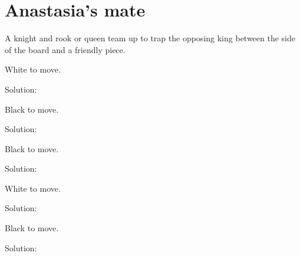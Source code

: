 \documentclass{book}
\begin{document}
\section{Anastasia's mate}
A knight and rook or queen team up to trap the opposing king between the side of the board and a friendly piece.\begin{multicols}{2} 
\begin{samepage} 
\newgame 


 
\showboard
 
 White to move. 
 
Solution: 
 
\end{samepage}\begin{samepage} 
\newgame 


 
\showboard
 
 Black to move. 
 
Solution: 
 
\end{samepage}\begin{samepage} 
\newgame 


 
\showboard
 
 Black to move. 
 
Solution: 
 
\end{samepage}\begin{samepage} 
\newgame 


 
\showboard
 
 White to move. 
 
Solution: 
 
\end{samepage}\begin{samepage} 
\newgame 


 
\showboard
 
 Black to move. 
 
Solution: 
 

\end{samepage}
\end{multicols}
\end{document}
